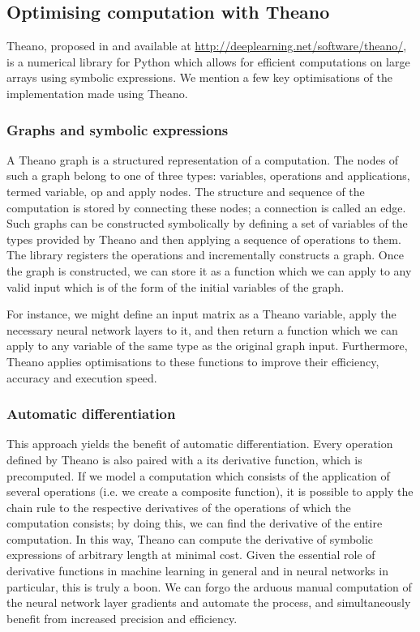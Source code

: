 \subsection{Optimising computation with Theano}
\label{sec:theano}
Theano, proposed in \cite{bergstra+al:2010-scipy} and available at
\url{http://deeplearning.net/software/theano/}, is a numerical library
for Python which allows for efficient computations on large arrays
using symbolic expressions. We mention a few key optimisations of the
implementation made using Theano.

\subsubsection{Graphs and symbolic expressions}
\label{sec:graph}
A Theano graph is a structured representation of a computation. The
nodes of such a graph belong to one of three types: variables,
operations and applications, termed variable, op and apply nodes. The
structure and sequence of the computation is stored by connecting
these nodes; a connection is called an edge. Such graphs can be
constructed symbolically by defining a set of variables of the types
provided by Theano and then applying a sequence of operations to
them. The library registers the operations and incrementally
constructs a graph. Once the graph is constructed, we can store it as
a function which we can apply to any valid input which is of the form
of the initial variables of the graph.

For instance, we might define an input matrix as a Theano variable,
apply the necessary neural network layers to it, and then return a
function which we can apply to any variable of the same type as the
original graph input. Furthermore, Theano applies optimisations to
these functions to improve their efficiency, accuracy and execution
speed.

\subsubsection{Automatic differentiation}
\label{sec:autodiff}
This approach yields the benefit of automatic differentiation. Every
operation defined by Theano is also paired with a its derivative
function, which is precomputed. If we model a computation which
consists of the application of several operations (i.e. we create a
composite function), it is possible to apply the chain rule to the
respective derivatives of the operations of which the computation
consists; by doing this, we can find the derivative of the entire
computation. In this way, Theano can compute the derivative of
symbolic expressions of arbitrary length at minimal cost. Given the
essential role of derivative functions in machine learning in general
and in neural networks in particular, this is truly a boon. We can
forgo the arduous manual computation of the neural network layer
gradients and automate the process, and simultaneously benefit from
increased precision and efficiency.

